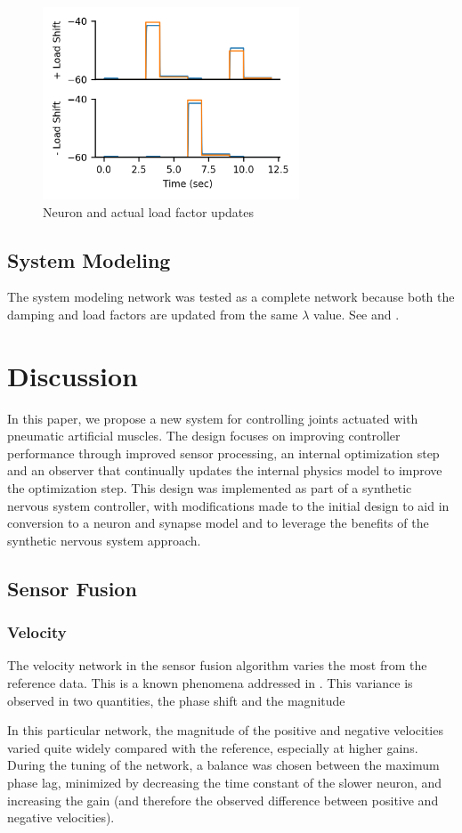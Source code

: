 \documentclass[letterpaper, 10 pt, conference]{IEEEconf} %
\newcommand{\myref}[1]{\hyperref[#1]{\Cref{#1}}}
\newcommand{\bbs}[1]{\section{#1}}
\newcommand{\bbss}[1]{\subsection{#1}}
\newcommand{\bbsss}[1]{\subsubsection{#1}}
\begin{document}
\begin{figure}
\centering
\includegraphics[height=2.25in]{results/TestSystemN}
\caption{Neuron and actual load factor updates}
\label{fig:TestSystemN}
\end{figure}

\bbss{System Modeling}

The system modeling network was tested as a complete network because both the 
damping and load factors are updated from the same $\lambda$ value. See \myref{
fig:TestSystemC} and \myref{fig:TestSystemN}.


\bbs{Discussion}
\label{chap:discussion}

In this paper, we propose a new system for controlling joints actuated with 
pneumatic artificial muscles. The design focuses on improving controller 
performance through improved sensor processing, an internal optimization step 
and an observer that continually updates the internal physics model to improve 
the optimization step. This design was implemented as part of a synthetic 
nervous system controller, with modifications made to the initial design to aid
in conversion to a neuron and synapse model and to leverage the benefits of the
synthetic nervous system approach.

\bbss{Sensor Fusion}
\bbsss{Velocity}

The velocity network in the sensor fusion algorithm varies the most from the 
reference data. This is a known phenomena addressed in 
\cite{NickFunctionalSubnetwork}. This variance is observed in two quantities, 
the phase shift and the magnitude

In this particular network, the magnitude of the positive and negative 
velocities varied quite widely compared with the reference, especially at 
higher gains. During the tuning of the network, a balance was chosen between 
the maximum phase lag, minimized by decreasing the time constant of the slower 
neuron, and increasing the gain (and therefore the observed difference between 
positive and negative velocities).
\end{document}
